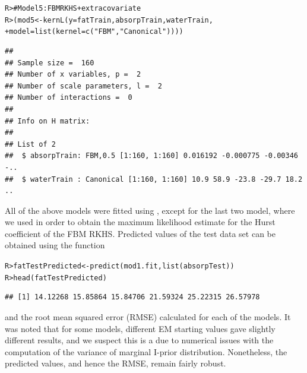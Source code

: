 \documentclass[a4paper,showframe,11pt]{report}\usepackage[]{graphicx}\usepackage[]{color}
\makeatletter
\newcommand{\hlstr}[1]{\textcolor[rgb]{0.063,0.58,0.627}{#1}}%
\newcommand{\hlcom}[1]{\textcolor[rgb]{0.588,0.588,0.588}{#1}}%
\newcommand{\hlstd}[1]{\textcolor[rgb]{0.196,0.196,0.196}{#1}}%
\newcommand{\hlkwb}[1]{\textcolor[rgb]{0.627,0,0.314}{#1}}%
\newcommand{\hlkwc}[1]{\textcolor[rgb]{0,0.631,0.314}{#1}}%
\newcommand{\hlkwd}[1]{\textcolor[rgb]{0.78,0.227,0.412}{#1}}%
\newenvironment{kframe}{%
 \def\at@end@of@kframe{}%
 \ifinner\ifhmode%
  \def\at@end@of@kframe{\end{minipage}}%
  \begin{minipage}{\columnwidth}%
 \fi\fi%
 \def\FrameCommand##1{\hskip\@totalleftmargin \hskip-\fboxsep
 \colorbox{shadecolor}{##1}\hskip-\fboxsep
     \hskip-\linewidth \hskip-\@totalleftmargin \hskip\columnwidth}%
 \MakeFramed {\advance\hsize-\width
   \@totalleftmargin\z@ \linewidth\hsize
   \@setminipage}}%
 {\par\unskip\endMakeFramed%
 \at@end@of@kframe}
\newenvironment{knitrout}{}{} %
\makeatother
\begin{document}
\begin{knitrout}
\color{fgcolor}\begin{kframe}
\begin{alltt}
\hlstd{R> }\hlcom{# Model 5: FBM RKHS + extra covariate}
\hlstd{R> }\hlstd{(mod5} \hlkwb{<-} \hlkwd{kernL}\hlstd{(}\hlkwc{y} \hlstd{= fatTrain, absorpTrain, waterTrain,}
\hlstd{+  }               \hlkwc{model} \hlstd{=} \hlkwd{list}\hlstd{(}\hlkwc{kernel} \hlstd{=} \hlkwd{c}\hlstd{(}\hlstr{"FBM"}\hlstd{,} \hlstr{"Canonical"}\hlstd{))))}
\end{alltt}
\begin{verbatim}
## 
## Sample size =  160 
## Number of x variables, p =  2 
## Number of scale parameters, l =  2 
## Number of interactions =  0 
## 
## Info on H matrix:
## 
## List of 2
##  $ absorpTrain: FBM,0.5 [1:160, 1:160] 0.016192 -0.000775 -0.00346 -..
##  $ waterTrain : Canonical [1:160, 1:160] 10.9 58.9 -23.8 -29.7 18.2 ..
\end{verbatim}
\end{kframe}
\end{knitrout}


All of the above models were fitted using , except for the last two model, where we used  in order to obtain the maximum likelihood estimate for the Hurst coefficient of the FBM RKHS. Predicted values of the test data set can be obtained using the  function

\begin{knitrout}
\color{fgcolor}\begin{kframe}
\begin{alltt}
\hlstd{R> }\hlstd{fatTestPredicted} \hlkwb{<-} \hlkwd{predict}\hlstd{(mod1.fit,} \hlkwd{list}\hlstd{(absorpTest))}
\hlstd{R> }\hlkwd{head}\hlstd{(fatTestPredicted)}
\end{alltt}
\begin{verbatim}
## [1] 14.12268 15.85864 15.84706 21.59324 25.22315 26.57978
\end{verbatim}
\end{kframe}
\end{knitrout}

and the root mean squared error (RMSE) calculated for each of the models. It was noted that for some models, different EM starting values gave slightly different results, and we suspect this is a due to numerical issues with the computation of the variance of marginal I-prior distribution. Nonetheless, the predicted values, and hence the RMSE, remain fairly robust.
\end{document}

